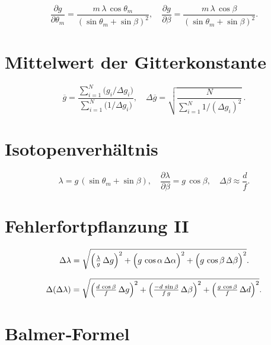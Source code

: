 \begin{equation}
  \frac{\partial g}{\partial\theta_m}
  = \frac{m\,\lambda\,\cos\theta_m}{(\sin\theta_m + \sin\beta)^{2}},
  \quad
  \frac{\partial g}{\partial\beta}
  = \frac{m\,\lambda\,\cos\beta}{(\sin\theta_m + \sin\beta)^{2}}.
\end{equation}

\section*{Mittelwert der Gitterkonstante}

\begin{equation}
  \overline{g}
  = \frac{\sum_{i=1}^{N} \bigl(g_i/\Delta g_i\bigr)}
         {\sum_{i=1}^{N} \bigl(1/\Delta g_i\bigr)},
  \quad
  \Delta\overline{g}
  = \sqrt{\frac{N}{\sum_{i=1}^{N} 1/(\Delta g_i)^{2}}}\,.
\end{equation}

\section*{Isotopenverhältnis}

\begin{equation}
  \lambda = g\,(\sin\theta_m + \sin\beta),
  \quad
  \frac{\partial\lambda}{\partial\beta} = g\,\cos\beta,
  \quad
  \Delta\beta \approx \frac{d}{f}.
\end{equation}

\section*{Fehlerfortpflanzung II}

\begin{equation}
  \Delta\lambda
  = \sqrt{
      \Bigl(\tfrac{\lambda}{g}\,\Delta g\Bigr)^{2}
    + \Bigl(g\,\cos\alpha\,\Delta\alpha\Bigr)^{2}
    + \Bigl(g\,\cos\beta\,\Delta\beta\Bigr)^{2}
  }.
\end{equation}

\begin{equation}
  \Delta(\Delta\lambda)
  = \sqrt{
      \Bigl(\tfrac{d\,\cos\beta}{f}\,\Delta g\Bigr)^{2}
    + \Bigl(\tfrac{-d\,\sin\beta}{f\,g}\,\Delta\beta\Bigr)^{2}
    + \Bigl(\tfrac{g\,\cos\beta}{f}\,\Delta d\Bigr)^{2}
  }.
\end{equation}

\section*{Balmer‐Formel}

